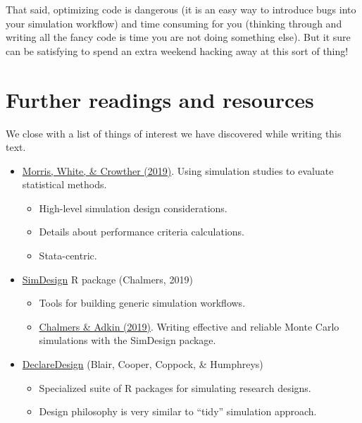 \documentclass[
]{book}
\providecommand{\tightlist}{%
  \setlength{\itemsep}{0pt}\setlength{\parskip}{0pt}}
\begin{document}
That said, optimizing code is dangerous (it is an easy way to introduce bugs into your simulation workflow) and time consuming for you (thinking through and writing all the fancy code is time you are not doing something else).
But it sure can be satisfying to spend an extra weekend hacking away at this sort of thing!

\chapter{Further readings and resources}\label{further-readings-and-resources}

We close with a list of things of interest we have discovered while writing this text.

\begin{itemize}
\item
  \href{https://doi.org/10.1002/sim.8086}{Morris, White, \& Crowther (2019)}. Using simulation studies to evaluate statistical methods.

  \begin{itemize}
  \tightlist
  \item
    High-level simulation design considerations.
  \item
    Details about performance criteria calculations.
  \item
    Stata-centric.
  \end{itemize}
\item
  \href{https://github.com/philchalmers/SimDesign/wiki}{SimDesign} R package (Chalmers, 2019)

  \begin{itemize}
  \tightlist
  \item
    Tools for building generic simulation workflows.
  \item
    \href{http://www.tqmp.org/RegularArticles/vol16-4/p248/}{Chalmers \& Adkin (2019)}. Writing effective and reliable Monte Carlo simulations with the SimDesign package.
  \end{itemize}
\item
  \href{https://declaredesign.org/}{DeclareDesign} (Blair, Cooper, Coppock, \& Humphreys)

  \begin{itemize}
  \tightlist
  \item
    Specialized suite of R packages for simulating research designs.
  \item
    Design philosophy is very similar to ``tidy'' simulation approach.
  \end{itemize}
\end{itemize}
\end{document}
